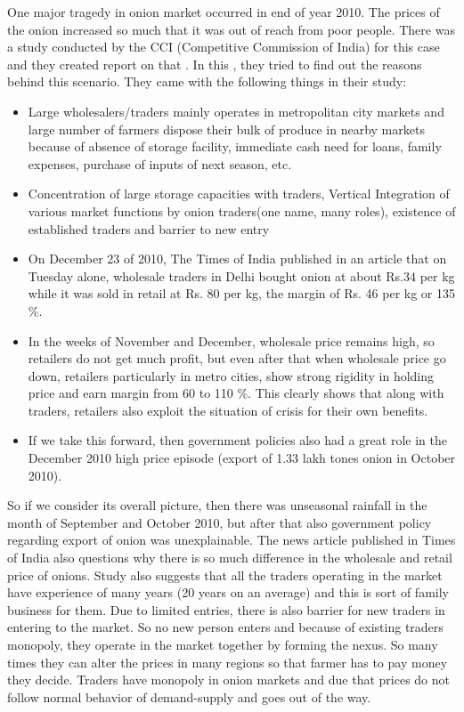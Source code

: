 One major tragedy in onion market occurred in end of year 2010. The prices of the onion increased so much that it was out of reach from poor people. There was a study conducted by the CCI (Competitive Commission of India) for this case and they created report on that \cite{CCI}. In this \cite{CCI}, they tried to find out the reasons behind this scenario. They came with the following things in their study:

\begin{itemize}

\item Large wholesalers/traders mainly operates in metropolitan city markets and large number of farmers dispose their bulk of produce in nearby markets because of absence of storage facility, immediate cash need for loans, family expenses, purchase of inputs of next season, etc.

\item Concentration of large storage capacities with traders, Vertical Integration of various market functions by onion traders(one name, many roles), existence of established traders and barrier to new entry

\item On December 23 of 2010, The Times of India published in an article that on Tuesday alone, wholesale traders in Delhi bought onion at about Rs.34 per kg while it was sold in retail at Rs. 80 per kg, the margin of Rs. 46 per kg or 135 \%.

\item In the weeks of November and December, wholesale price remains high, so retailers do not get much profit, but even after that when wholesale price go down, retailers particularly in metro cities, show strong rigidity in holding price and earn margin from 60 to 110 \%. This clearly shows that along with traders, retailers also exploit the situation of crisis for their own benefits.

\item If we take this forward, then government policies also had a great role in the December 2010 high price episode (export of 1.33 lakh tones onion in October 2010).

\end{itemize}

So if we consider its overall picture, then there was unseasonal rainfall in the month of September and October 2010, but after that also government policy regarding export of onion was unexplainable. The news article published in Times of India also questions why there is so much difference in the wholesale and retail price of onions. Study also suggests that all the traders operating in the market have experience of many years (20 years on an average) and this is sort of family business for them. Due to limited entries, there is also barrier for new traders in entering to the market. So no new person enters and because of existing traders monopoly, they operate in the market together by forming the nexus. So many times they can alter the prices in many regions so that farmer has to pay money they decide. Traders have monopoly in onion markets and due that prices do not follow normal behavior of demand-supply and goes out of the way.



